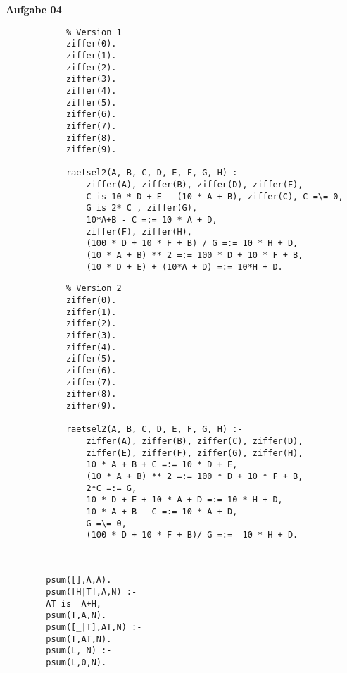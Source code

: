 \documentclass[a4paper,10pt]{article}
\begin{document}
	\newpage
	\textbf{Aufgabe 04}
	\begin{compactenum} [(a)]
		\item \begin{compactenum} [(V 1)]
			\item 
			\begin{verbatim}
			% Version 1
			ziffer(0).
			ziffer(1).
			ziffer(2).
			ziffer(3).
			ziffer(4).
			ziffer(5).
			ziffer(6).
			ziffer(7).
			ziffer(8).
			ziffer(9).
			
			raetsel2(A, B, C, D, E, F, G, H) :-
				ziffer(A), ziffer(B), ziffer(D), ziffer(E),
				C is 10 * D + E - (10 * A + B), ziffer(C), C =\= 0,
				G is 2* C , ziffer(G),
				10*A+B - C =:= 10 * A + D,
				ziffer(F), ziffer(H),
				(100 * D + 10 * F + B) / G =:= 10 * H + D,
				(10 * A + B) ** 2 =:= 100 * D + 10 * F + B,
				(10 * D + E) + (10*A + D) =:= 10*H + D.
			\end{verbatim}
			\item 
			\begin{verbatim}
			% Version 2
			ziffer(0).
			ziffer(1).
			ziffer(2).
			ziffer(3).
			ziffer(4).
			ziffer(5).
			ziffer(6).
			ziffer(7).
			ziffer(8).
			ziffer(9).
			
			raetsel2(A, B, C, D, E, F, G, H) :-
				ziffer(A), ziffer(B), ziffer(C), ziffer(D),
				ziffer(E), ziffer(F), ziffer(G), ziffer(H),
				10 * A + B + C =:= 10 * D + E,
				(10 * A + B) ** 2 =:= 100 * D + 10 * F + B,
				2*C =:= G,
				10 * D + E + 10 * A + D =:= 10 * H + D,
				10 * A + B - C =:= 10 * A + D,
				G =\= 0,
				(100 * D + 10 * F + B)/ G =:=  10 * H + D.
			\end{verbatim}
		\end{compactenum}\
		\item 
		\begin{verbatim}
		psum([],A,A).
		psum([H|T],A,N) :-
		AT is  A+H,
		psum(T,A,N).
		psum([_|T],AT,N) :-
		psum(T,AT,N).
		psum(L, N) :-
		psum(L,0,N).
		\end{verbatim}
	\end{compactenum}
\end{document}
